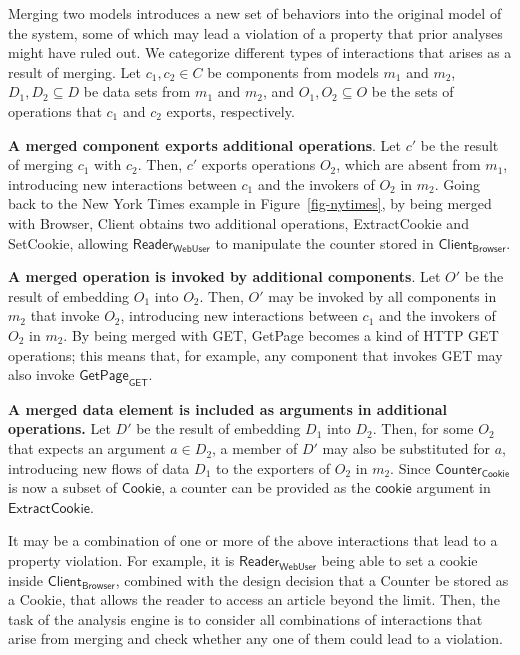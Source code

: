 Merging two models introduces a new set of behaviors into
the original model of the system, some of which may lead a violation
of a property that prior analyses might have ruled out. We categorize
different types of interactions that arises as a result of
merging. Let $c_1, c_2 \in C$ be components from models $m_{1}$ and
$m_{2}$, $D_1, D_2 \subseteq D$ be data sets from $m_{1}$ and $m_{2}$, and
$O_1, O_2 \subseteq O$ be the sets of operations that $c_1$ and $c_2$
exports, respectively. 

\textbf{A merged component exports additional operations}. Let $c'$ be
the result of merging $c_1$ with $c_2$. Then, $c'$ exports operations
$O_2$, which are absent from $m_1$, introducing new interactions
between $c_1$ and the invokers of $O_2$ in $m_2$. Going back to the
New York Times example in Figure~\ref{fig-nytimes}, by being merged
with \textsf{Browser}, \textsf{Client} obtains two additional
operations, \textsf{ExtractCookie} and \textsf{SetCookie}, allowing
$\textsf{Reader}_\textsf{WebUser}$ to manipulate the counter stored in
$\textsf{Client}_\textsf{Browser}$.

\textbf{A merged operation is invoked by additional components}. Let $O'$
be the result of embedding $O_1$ into $O_2$. Then, $O'$ may be invoked
by all components in $m_2$ that invoke $O_2$, introducing new interactions
between $c_1$ and the invokers of $O_2$ in $m_2$. By being merged with
\textsf{GET}, \textsf{GetPage} becomes a kind of HTTP GET operations;
this means that, for example, any component that invokes \textsf{GET}
may also invoke $\textsf{GetPage}_\textsf{GET}$.

\textbf{A merged data element is included as arguments in additional
  operations.}  Let $D'$ be the result of embedding $D_1$ into
$D_2$. Then, for some $O_2$ that expects an argument $a \in D_2$, a
member of $D'$ may also be substituted for $a$, introducing new flows
of data $D_1$ to the exporters of $O_2$ in $m_2$. Since
$\textsf{Counter}_\textsf{Cookie}$ is now a subset of
$\textsf{Cookie}$, a counter can be provided as the $\textsf{cookie}$
argument in $\textsf{ExtractCookie}$.

It may be a combination of one or more of the above interactions that
lead to a property violation. For example, it is
$\textsf{Reader}_\textsf{WebUser}$ being able to set a cookie inside
$\textsf{Client}_\textsf{Browser}$, combined with the design decision
that a \textsf{Counter} be stored as a \textsf{Cookie}, that allows
the reader to access an article beyond the limit. Then, the task of
the analysis engine is to consider all combinations of interactions
that arise from merging and check whether any one of them could lead
to a violation.

